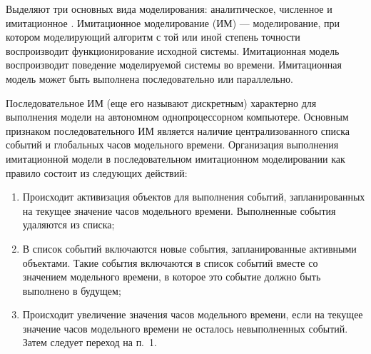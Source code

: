 



Выделяют три основных вида моделирования: аналитическое, численное и имитационное \cite{disksobmod}. Имитационное моделирование (ИМ)  --- моделирование, при котором моделирующий алгоритм с той или иной степень точности воспроизводит функционирование исходной системы. Имитационная модель воспроизводит поведение моделируемой системы во времени. Имитационная модель может быть выполнена последовательно или параллельно.

Последовательное ИМ (еще его называют дискретным) характерно для выполнения модели на автономном однопроцессорном компьютере. Основным признаком последовательного ИМ является наличие централизованного списка событий и глобальных часов модельного времени. Организация выполнения имитационной модели в последовательном имитационном моделировании как правило состоит из следующих действий:
\begin{enumerate}
	\item Происходит активизация объектов для выполнения событий, запланированных на текущее значение часов модельного времени. Выполненные события удаляются из списка;
	\item В список событий включаются новые события, запланированные активными объектами. Такие события включаются в список событий вместе со значением модельного времени, в которое это событие должно быть выполнено в будущем;
	\item Происходит увеличение значения часов модельного времени, если на текущее значение часов модельного времени не осталось невыполненных событий. Затем следует переход на п.~1.
\end{enumerate}

